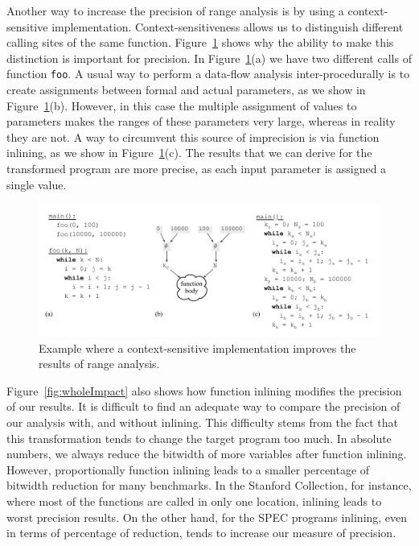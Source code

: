 \documentclass{paper}
\begin{document}
Another way to increase the precision of range analysis is by using a
context-sensitive implementation.
Context-sensitiveness allows us to distinguish different calling sites of
the same function.
Figure~\ref{fig:context} shows why the ability to make this distinction is
important for precision.
In Figure~\ref{fig:context}(a) we have two different calls of function
\texttt{foo}.
A usual way to perform a data-flow analysis inter-procedurally is to
create assignments between formal and actual parameters, as we show in
Figure~\ref{fig:context}(b).
However, in this case the multiple assignment of values to parameters
makes the ranges of these parameters very large, whereas in reality they
are not.
A way to circumvent this source of imprecision is via function inlining,
as we show in Figure~\ref{fig:context}(c).
The results that we can derive for the transformed program are more
precise, as each input parameter is assigned a single value.

\begin{figure}[t!]
\begin{center}
\includegraphics[width=\textwidth]{images/context}
\end{center}
\caption{\label{fig:context}
Example where a context-sensitive implementation improves the results of
range analysis.
}
\end{figure}

Figure~\ref{fig:wholeImpact} also shows how function inlining modifies the
precision of our results.
It is difficult to find an adequate way to compare the precision of
our analysis with, and without inlining.
This difficulty stems from the fact that this transformation tends to change
the target program too much.
In absolute numbers, we always reduce the bitwidth of more variables after
function inlining.
However, proportionally function inlining leads to a smaller percentage of
bitwidth reduction for many benchmarks.
In the Stanford Collection, for instance, where most of the functions are
called in only one location, inlining leads to worst precision results.
On the other hand, for the SPEC programs inlining, even in terms of
percentage of reduction, tends to increase our measure of precision.
\end{document}
